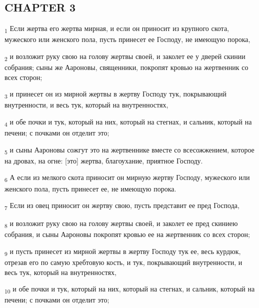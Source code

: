 \subsection{CHAPTER 3}
\begin{tcolorbox}
\textsubscript{1} Если жертва его жертва мирная, и если он приносит из крупного скота, мужеского или женского пола, пусть принесет ее Господу, не имеющую порока,
\end{tcolorbox}
\begin{tcolorbox}
\textsubscript{2} и возложит руку свою на голову жертвы своей, и заколет ее у дверей скинии собрания; сыны же Аароновы, священники, покропят кровью на жертвенник со всех сторон;
\end{tcolorbox}
\begin{tcolorbox}
\textsubscript{3} и принесет он из мирной жертвы в жертву Господу тук, покрывающий внутренности, и весь тук, который на внутренностях,
\end{tcolorbox}
\begin{tcolorbox}
\textsubscript{4} и обе почки и тук, который на них, который на стегнах, и сальник, который на печени; с почками он отделит это;
\end{tcolorbox}
\begin{tcolorbox}
\textsubscript{5} и сыны Аароновы сожгут это на жертвеннике вместе со всесожжением, которое на дровах, на огне: [это] жертва, благоухание, приятное Господу.
\end{tcolorbox}
\begin{tcolorbox}
\textsubscript{6} А если из мелкого скота приносит он мирную жертву Господу, мужеского или женского пола, пусть принесет ее, не имеющую порока.
\end{tcolorbox}
\begin{tcolorbox}
\textsubscript{7} Если из овец приносит он жертву свою, пусть представит ее пред Господа,
\end{tcolorbox}
\begin{tcolorbox}
\textsubscript{8} и возложит руку свою на голову жертвы своей, и заколет ее пред скиниею собрания, и сыны Аароновы покропят кровью ее на жертвенник со всех сторон;
\end{tcolorbox}
\begin{tcolorbox}
\textsubscript{9} и пусть принесет из мирной жертвы в жертву Господу тук ее, весь курдюк, отрезав его по самую хребтовую кость, и тук, покрывающий внутренности, и весь тук, который на внутренностях,
\end{tcolorbox}
\begin{tcolorbox}
\textsubscript{10} и обе почки и тук, который на них, который на стегнах, и сальник, который на печени; с почками он отделит это;
\end{tcolorbox}
